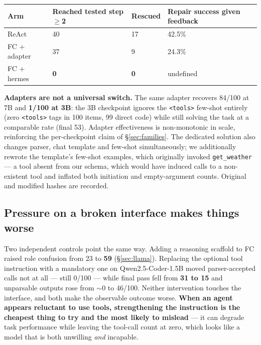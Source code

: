\begin{center}
\begin{minipage}{\linewidth}
\centering
\small
{}\label{tab:given_feedback}
\begin{tabular}{@{}llll@{}}
\toprule
Arm & Reached tested step $\geq$2 & Rescued & Repair success given feedback \\
\midrule
ReAct & 40 & 17 & 42.5\% \\
FC + adapter & 37 & 9 & 24.3\% \\
FC + hermes & \textbf{0} & \textbf{0} & undefined \\
\bottomrule
\end{tabular}
\end{minipage}
\end{center}

\textbf{Adapters are not a universal switch.} The same adapter recovers 84/100 at 7B and
\textbf{1/100 at 3B}: the 3B checkpoint ignores the \texttt{<tools>} few-shot entirely (zero
\texttt{<tools>} tags in 100 items, 99 direct code) while still solving the task at a comparable
rate (final 53). Adapter effectiveness is non-monotonic in scale, reinforcing the per-checkpoint
claim of \S\ref{sec:families}. The dedicated solution also changes parser, chat template and
few-shot simultaneously; we additionally rewrote the template's few-shot examples, which
originally invoked \texttt{get\_weather} --- a tool absent from our schema, which would have
induced calls to a non-existent tool and inflated both initiation and empty-argument counts.
Original and modified hashes are recorded.

\subsection{Pressure on a broken interface makes things worse}
\label{sec:pressure}

Two independent controls point the same way. Adding a reasoning scaffold to FC raised role
confusion from 23 to \textbf{59} (\S\ref{sec:llama}). Replacing the optional tool instruction
with a mandatory one on Qwen2.5-Coder-1.5B moved parser-accepted calls not at all --- still
0/100 --- while final pass fell from \textbf{31 to 15} and unparsable outputs rose from
${\sim}0$ to 46/100. Neither intervention touches the interface, and both make the observable
outcome worse. \textbf{When an agent appears reluctant to use tools, strengthening the
instruction is the cheapest thing to try and the most likely to mislead} --- it can degrade task
performance while leaving the tool-call count at zero, which looks like a model that is both
unwilling \emph{and} incapable.

